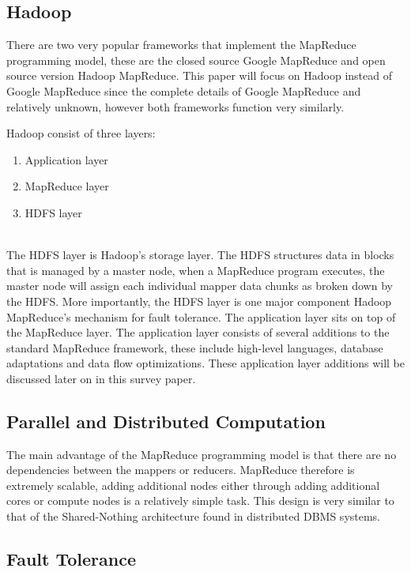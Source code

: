 \documentclass[10pt,twocolumn]{IEEEtran11}
\begin{document}
\subsection{Hadoop}
There are two very popular frameworks that implement the MapReduce programming model, these are the closed source Google MapReduce and open source version Hadoop MapReduce.  
This paper will focus on Hadoop instead of Google MapReduce since the complete details of Google MapReduce and relatively unknown, however both frameworks function very similarly.
\par
Hadoop consist of three layers:
\  \\
\begin{enumerate}
	\setlength\itemsep{1em}
	\item Application layer
	\item MapReduce layer
	\item HDFS layer
\end{enumerate} 
\  \\
The HDFS layer is Hadoop's storage layer.  The HDFS structures data in blocks that is managed by a master node, when a MapReduce program executes, the master node will assign each individual mapper data chunks as broken down by the HDFS.  More importantly, the HDFS layer is one major component Hadoop MapReduce's mechanism for
fault tolerance.  The application layer sits on top of the MapReduce layer.  The application layer consists of several additions to the standard MapReduce framework, these include high-level languages, database adaptations and data flow optimizations.  These application layer additions will be discussed later on in this survey paper.

\subsection{Parallel and Distributed Computation}

The main advantage of the MapReduce programming model is that there are no dependencies between the mappers or reducers.  MapReduce therefore is extremely scalable, adding additional nodes either through adding additional cores or compute nodes is a relatively simple task.  This design is very similar to that of the Shared-Nothing architecture found in distributed DBMS systems.

\subsection{Fault Tolerance}
\end{document}
